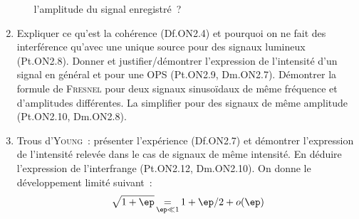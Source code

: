 \documentclass[a4paper, 12pt, final, garamond]{book}
\begin{document}
\begin{enumerate}
\begin{enumerate}[label=\sqenumi]
		            l'amplitude du signal enregistré~?
	      \end{enumerate}
	\item Expliquer ce qu'est la cohérence (Df.ON2.4) et pourquoi on ne fait des
	      interférence qu'avec une unique source pour des signaux lumineux (Pt.ON2.8).
	      Donner et justifier/démontrer l'expression de l'intensité d'un signal en
	      général et pour une OPS (Pt.ON2.9, Dm.ON2.7). Démontrer la formule de
	      \textsc{Fresnel} pour deux signaux sinusoïdaux de même fréquence et
	      d'amplitudes différentes. La simplifier pour des signaux de même
	      amplitude (Pt.ON2.10, Dm.ON2.8).
	\item Trous d'\textsc{Young}~: présenter l'expérience (Df.ON2.7) et démontrer
	      l'expression de l'intensité relevée dans le cas de signaux de même
	      intensité. En déduire l'expression de l'interfrange (Pt.ON2.12,
	      Dm.ON2.10).
	      \smallbreak
	      On donne le développement limité suivant~:
	      \[\sqrt{1+\ep} \mathop{=}\limits_{\ep \ll 1} 1 + \ep/2 + o(\ep)\]
\end{enumerate}
\end{document}
